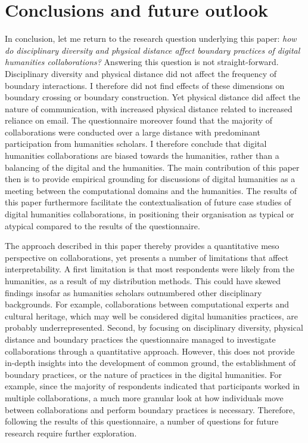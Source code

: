\documentclass{article}
\begin{document}
\section{Conclusions and future outlook}
In conclusion, let me return to the research question underlying this paper: \textit{how do disciplinary diversity and physical distance affect boundary practices of digital humanities collaborations?}
Answering this question is not straight-forward. 
Disciplinary diversity and physical distance did not affect the frequency of boundary interactions.
I therefore did not find effects of these dimensions on boundary crossing or boundary construction.
Yet physical distance did affect the nature of communication, with increased physical distance related to increased reliance on email.
The questionnaire moreover found that the majority of collaborations were conducted over a large distance with predominant participation from humanities scholars. 
I therefore conclude that digital humanities collaborations are biased towards the humanities, rather than a balancing of the digital and the humanities.
The main contribution of this paper then is to provide empirical grounding for discussions of digital humanities as a meeting between the computational domains and the humanities.
The results of this paper furthermore facilitate the contextualisation of future case studies of digital humanities collaborations, in positioning their organisation as typical or atypical compared to the results of the questionnaire.


The approach described in this paper
thereby provides a quantitative meso perspective on collaborations, yet
presents a number of limitations that affect interpretability. 
A first limitation is that most respondents were likely from the humanities, as a result of my distribution methods. This could have skewed findings insofar as humanities scholars outnumbered other disciplinary backgrounds. For example, collaborations between computational experts and cultural heritage, which may well be considered digital humanities practices, are probably underrepresented. 
Second, by focusing on disciplinary diversity, physical distance and boundary practices the questionnaire managed to investigate collaborations through a quantitative approach. However, this does not provide in-depth insights into the development of common ground, the establishment of boundary practices, or the nature of practices in the digital humanities.
For example, since the majority of respondents indicated that participants worked in multiple collaborations, a much more granular look at how individuals move between collaborations and perform boundary practices is necessary.
Therefore, following the results of this questionnaire, a number of questions for future research require further exploration.
\end{document}

